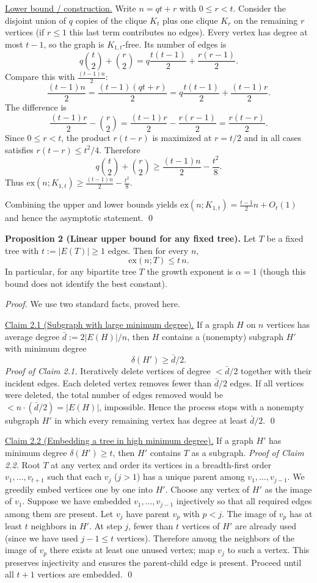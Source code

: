 \underline{Lower bound / construction.}
Write $n=qt+r$ with $0\le r<t$. Consider the disjoint union of $q$ copies of the clique $K_t$ plus one clique $K_r$ on the remaining $r$ vertices (if $r\le 1$ this last term contributes no edges). Every vertex has degree at most $t-1$, so the graph is $K_{1,t}$-free.
Its number of edges is
\[
q\binom{t}{2}+\binom{r}{2} = q\frac{t(t-1)}{2}+\frac{r(r-1)}{2}.
\]
Compare this with $\frac{(t-1)n}{2}$:
\[
\frac{(t-1)n}{2}=\frac{(t-1)(qt+r)}{2}=q\frac{t(t-1)}{2}+\frac{(t-1)r}{2}.
\]
The difference is
\[
\frac{(t-1)r}{2}-\binom{r}{2}=\frac{(t-1)r}{2}-\frac{r(r-1)}{2}=\frac{r(t-r)}{2}.
\]
Since $0\le r<t$, the product $r(t-r)$ is maximized at $r=t/2$ and in all cases satisfies $r(t-r)\le t^2/4$. Therefore
\[
q\binom{t}{2}+\binom{r}{2} \ge \frac{(t-1)n}{2}-\frac{t^2}{8}.
\]
Thus $\mathrm{ex}(n;K_{1,t})\ge \frac{(t-1)n}{2}-\frac{t^2}{8}$.

Combining the upper and lower bounds yields $\mathrm{ex}(n;K_{1,t})=\frac{t-1}{2}n+O_t(1)$ and hence the asymptotic statement.
\qed

\medskip
\textbf{Proposition 2 (Linear upper bound for any fixed tree).}
Let $T$ be a fixed tree with $t:=|E(T)|\ge 1$ edges. Then for every $n$,
\[
\mathrm{ex}(n;T) \le t\,n.
\]
In particular, for any bipartite tree $T$ the growth exponent is $\alpha=1$ (though this bound does not identify the best constant).

\emph{Proof.}
We use two standard facts, proved here.

\underline{Claim 2.1 (Subgraph with large minimum degree).}
If a graph $H$ on $n$ vertices has average degree $\bar d:=2|E(H)|/n$, then $H$ contains a (nonempty) subgraph $H'$ with minimum degree
\[
\delta(H')\ge \bar d/2.
\]
\emph{Proof of Claim 2.1.}
Iteratively delete vertices of degree $<\bar d/2$ together with their incident edges. Each deleted vertex removes fewer than $\bar d/2$ edges. If all vertices were deleted, the total number of edges removed would be $< n\cdot(\bar d/2)=|E(H)|$, impossible. Hence the process stops with a nonempty subgraph $H'$ in which every remaining vertex has degree at least $\bar d/2$.
\qed

\underline{Claim 2.2 (Embedding a tree in high minimum degree).}
If a graph $H'$ has minimum degree $\delta(H')\ge t$, then $H'$ contains $T$ as a subgraph.
\emph{Proof of Claim 2.2.}
Root $T$ at any vertex and order its vertices in a breadth-first order $v_1,\dots,v_{t+1}$ such that each $v_j$ ($j>1$) has a unique parent among $v_1,\dots,v_{j-1}$. We greedily embed vertices one by one into $H'$.
Choose any vertex of $H'$ as the image of $v_1$. Suppose we have embedded $v_1,\dots,v_{j-1}$ injectively so that all required edges among them are present. Let $v_j$ have parent $v_p$ with $p<j$. The image of $v_p$ has at least $t$ neighbors in $H'$.
At step $j$, fewer than $t$ vertices of $H'$ are already used (since we have used $j-1\le t$ vertices). Therefore among the neighbors of the image of $v_p$ there exists at least one unused vertex; map $v_j$ to such a vertex. This preserves injectivity and ensures the parent-child edge is present. Proceed until all $t+1$ vertices are embedded.
\qed

